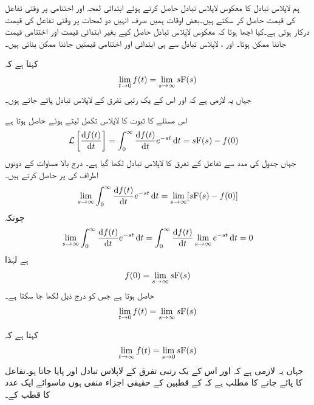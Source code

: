ہم لاپلاس تبادل  کا معکوس لاپلاس  تبادل  حاصل کرتے ہوئے ابتدائی لمحہ  اور اختتامی  پر وقتی تفاعل کی قیمت حاصل کر سکتے ہیں۔بعض اوقات ہمیں صرف انہیں دو لمحات پر وقتی تفاعل کی قیمت درکار ہوتی ہے۔کیا اچھا ہوتا کہ معکوس لاپلاس تبادل حاصل کیے بغیر ابتدائی قیمت اور اختتامی قیمت جاننا ممکن ہوتا۔ اور ، لاپلاس تبادل سے ہی ابتدائی اور اختتامی قیمتیں جاننا ممکن بناتی ہیں۔

 کہتا ہے  کہ
\begin{align}
\lim_{t \to 0} f(t)=\lim_{s \to \infty} s{{\textup{F}}}(s)
\end{align}
جہاں یہ لازمی ہے کہ   اور اس کے یک رتبی تفرق  کے لاپلاس تبادل پائے جاتے ہوں۔

اس مسئلے کا ثبوت  کا لاپلاس تکمل لیتے ہوئے حاصل ہوتا ہے
\begin{align*}
\Laplace\left[\frac{\dif f(t)}{\dif t}\right]&=\int_0^{\infty} \frac{\dif f(t)}{\dif t} e^{-st} \dif t=s\bF(s)-f(0)
\end{align*}
جہاں جدول  کی مدد سے تفاعل کے تفرق کا لاپلاس تبادل لکھا گیا ہے۔ درج بالا مساوات کے دونوں اطراف کی   پر حاصل کرتے ہیں۔
\begin{align*}
\lim_{s \to \infty}\int_0^{\infty} \frac{\dif f(t)}{\dif t} e^{-st} \dif t=\lim_{s \to \infty}[s\bF(s)-f(0)]
\end{align*}
چونکہ
\begin{align*}
\lim_{s \to \infty}\int_0^{\infty} \frac{\dif f(t)}{\dif t} e^{-st} \dif t=\int_0^{\infty} \frac{\dif f(t)}{\dif t} \lim_{s \to \infty} e^{-st} \dif t=0
\end{align*}
ہے لہٰذا
\begin{align*}
f(0)=\lim_{s \to \infty}s{{\textup{F}}}(s)
\end{align*}
حاصل ہوتا ہے جس کو درج ذیل لکھا جا سکتا ہے۔
\begin{align*}
\lim_{t \to 0}f(t)=\lim_{s \to \infty}s{{\textup{F}}}(s)
\end{align*}
   
 کہتا ہے  کہ
\begin{align}
\lim_{t \to \infty} f(t)=\lim_{s \to 0} s{{\textup{F}}}(s)
\end{align}
جہاں یہ لازمی ہے کہ   اور اس کے یک رتبی تفرق  کے لاپلاس تبادل اور  پایا جاتا ہو۔تفاعل کا  پائے جانے کا مطلب ہے کہ  کے قطبین کے حقیقی اجزاء منفی ہوں ماسوائے ایک عدد  کا قطب کے۔


